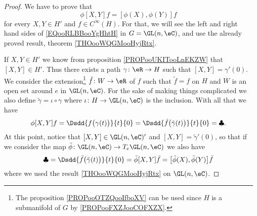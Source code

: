 \begin{proof}
	We have to prove that
	\begin{equation}        \label{EQooRLBBooYgHhtH}
		\phi[X,Y]f=[\phi(X),\phi(Y)]f
	\end{equation}
	for every \( X,Y\in H'\) and \( f\in  C^{\infty}(H)\). For that, we will see the left and right hand sides of \eqref{EQooRLBBooYgHhtH} in \( G=\GL(n,\eC)\), and use the already proved result, theorem \ref{THOooWQGMooHyjRtx}.

	If \( X,Y\in H'\) we know from proposition \ref{PROPooUKITooLnEKZW} that \( [X,Y]\in H'\). Thus there exists a path \( \gamma\colon \eR\to H\) such that \( [X,Y]=\gamma'(0)\). We consider the extension\footnote{The proposition \ref{PROPooOTZQooIfboXV} can be used since \( H\) is a submanifold of \( G\) by \ref{PROPooFXZJooCOFXZX}.} \( \tilde f\colon W\to \eR\) of \( f\) such that \( \tilde f=f\) on \( H\) and \( W\) is an open set around \( e\) in \( \GL(n,\eC)\). For the sake of making things complicated we also define \( \tilde \gamma=\iota\circ \gamma\) where \( \iota\colon H\to \GL(n,\eC)\) is the inclusion. With all that we have
	\begin{equation}
		\phi[X,Y]f=\Dsdd{ f\big( \gamma(t) \big) }{t}{0}=\Dsdd{ \tilde f\big( \tilde \gamma(t) \big) }{t}{0}=\clubsuit.
	\end{equation}
	At this point, notice that \( [X,Y]\in \GL(n,\eC)'\) and \( [X,Y]=\tilde \gamma'(0)\), so that if we consider the map \( \tilde \phi\colon \GL(n,\eC)\to T_e\GL(n,\eC)\) we also have
	\begin{equation}
		\clubsuit=\Dsdd{ \tilde f\big( \tilde \gamma(t) \big) }{t}{0}=\tilde \phi[X,Y]\tilde f=\big[ \tilde \phi(X),\tilde \phi(Y) \big]\tilde f
	\end{equation}
	where we used the result \ref{THOooWQGMooHyjRtx} on \( \GL(n,\eC)\).


\end{proof}

